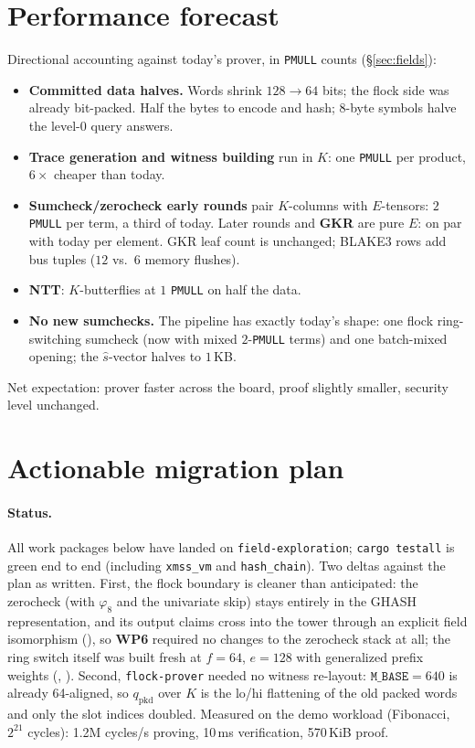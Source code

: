 \documentclass[11pt]{article}
\newcommand{\K}{K}            %
\newcommand{\E}{E}            %
\newcommand{\WP}[1]{\textbf{WP#1}}
\begin{document}
\section{Performance forecast}\label{sec:perf}

Directional accounting against today's prover, in \texttt{PMULL} counts
(\S\ref{sec:fields}):

\begin{itemize}
\item \textbf{Committed data halves.} Words shrink $128\to64$ bits; the
  flock side was already bit-packed. Half the bytes to encode and hash;
  8-byte symbols halve the level-0 query answers.
\item \textbf{Trace generation and witness building} run in $\K$: one
  \texttt{PMULL} per product, $6\times$ cheaper than today.
\item \textbf{Sumcheck/zerocheck early rounds} pair $\K$-columns with
  $\E$-tensors: $2$ \texttt{PMULL} per term, a third of today. Later
  rounds and \textbf{GKR} are pure $\E$: on par with today per element.
  GKR leaf count is unchanged; BLAKE3 rows add bus tuples ($12$ vs.\ $6$
  memory flushes).
\item \textbf{NTT}: $\K$-butterflies at $1$ \texttt{PMULL} on half the
  data.
\item \textbf{No new sumchecks.} The pipeline has exactly today's shape:
  one flock ring-switching sumcheck (now with mixed $2$-\texttt{PMULL}
  terms) and one batch-mixed opening; the $\widehat s$-vector halves to
  $1$\,KB.
\end{itemize}
Net expectation: prover faster across the board, proof slightly smaller,
security level unchanged.

\section{Actionable migration plan}\label{sec:plan}

\paragraph{Status.} All work packages below have landed on
\texttt{field-exploration}; \texttt{cargo testall} is green end to end
(including \texttt{xmss\_vm} and \texttt{hash\_chain}). Two deltas
against the plan as written. First, the flock boundary is cleaner than
anticipated: the zerocheck (with \(\varphi_8\) and the univariate skip)
stays entirely in the GHASH representation, and its output claims cross
into the tower through an explicit field isomorphism
(), so \WP6 required no
changes to the zerocheck stack at all; the ring switch itself was built
fresh at \(f=64\), \(e=128\) with generalized prefix weights
(, ). Second,
\texttt{flock-prover} needed no witness re-layout: \(\mathtt{M\_BASE}=640\)
is already 64-aligned, so \(q_{\mathrm{pkd}}\) over $\K$ is the lo/hi
flattening of the old packed words and only the slot indices doubled.
Measured on the demo workload (Fibonacci, $2^{21}$ cycles): 1.2M cycles/s
proving, 10\,ms verification, 570\,KiB proof.
\end{document}
